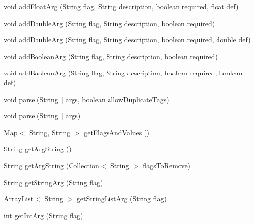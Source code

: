 \begin{DoxyCompactItemize}
\item 
void \hyperlink{classbroad_1_1core_1_1parser_1_1_command_line_parser_a11825bfaa3c2195cac040f71885d905b}{add\+Float\+Arg} (String flag, String description, boolean required, float def)
\item 
void \hyperlink{classbroad_1_1core_1_1parser_1_1_command_line_parser_a48920168143e988e8c7c694eb009944a}{add\+Double\+Arg} (String flag, String description, boolean required)
\item 
void \hyperlink{classbroad_1_1core_1_1parser_1_1_command_line_parser_a80d900f67d17dc6d3ef32b99017861c7}{add\+Double\+Arg} (String flag, String description, boolean required, double def)
\item 
void \hyperlink{classbroad_1_1core_1_1parser_1_1_command_line_parser_a29f0a27275c717df10c3e5a608d562b5}{add\+Boolean\+Arg} (String flag, String description, boolean required)
\item 
void \hyperlink{classbroad_1_1core_1_1parser_1_1_command_line_parser_a92b1d109fee6f5d93596203dfedc5778}{add\+Boolean\+Arg} (String flag, String description, boolean required, boolean def)
\item 
void \hyperlink{classbroad_1_1core_1_1parser_1_1_command_line_parser_af17c04bc7125acf4ee7d2e790b0e86b8}{parse} (String\mbox{[}$\,$\mbox{]} args, boolean allow\+Duplicate\+Tags)
\item 
void \hyperlink{classbroad_1_1core_1_1parser_1_1_command_line_parser_ad6dcff13248241df62c57f4cbfacae33}{parse} (String\mbox{[}$\,$\mbox{]} args)
\item 
Map$<$ String, String $>$ \hyperlink{classbroad_1_1core_1_1parser_1_1_command_line_parser_af4f549277703f59966280847ebb07660}{get\+Flags\+And\+Values} ()
\item 
String \hyperlink{classbroad_1_1core_1_1parser_1_1_command_line_parser_af859e4c1934b19df011c55aa27c3d9ee}{get\+Arg\+String} ()
\item 
String \hyperlink{classbroad_1_1core_1_1parser_1_1_command_line_parser_aea73ccacd3ef7fd25ddce6b45377684e}{get\+Arg\+String} (Collection$<$ String $>$ flags\+To\+Remove)
\item 
String \hyperlink{classbroad_1_1core_1_1parser_1_1_command_line_parser_ab453d8b59548ccda31289abff8f44b37}{get\+String\+Arg} (String flag)
\item 
Array\+List$<$ String $>$ \hyperlink{classbroad_1_1core_1_1parser_1_1_command_line_parser_a6906c17b029cb5293d812b520065163a}{get\+String\+List\+Arg} (String flag)
\item 
int \hyperlink{classbroad_1_1core_1_1parser_1_1_command_line_parser_a172b91cd4b699b9341366c6dcc1b3b8e}{get\+Int\+Arg} (String flag)

\end{DoxyCompactItemize}

